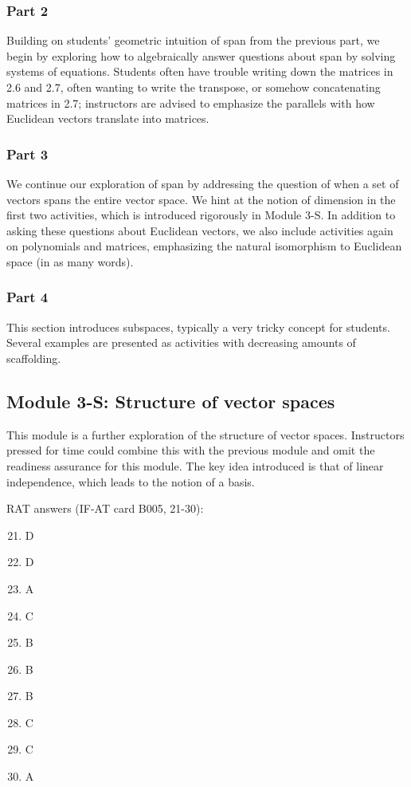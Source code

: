 \documentclass{article}
\begin{document}
\subsubsection*{Part 2}
Building on students' geometric intuition of span from the previous part, we begin by exploring how to algebraically answer questions about span by solving systems of equations.  Students often have trouble writing down the matrices in 2.6 and 2.7, often wanting to write the transpose, or somehow concatenating matrices in 2.7; instructors are advised to emphasize the parallels with how Euclidean vectors translate into matrices.

\subsubsection*{Part 3}
We continue our exploration of span by addressing the question of when a set of vectors spans the entire vector space.  We hint at the notion of dimension in the first two activities, which is introduced rigorously in Module 3-S.  In addition to asking these questions about Euclidean vectors, we also include activities again on polynomials and matrices, emphasizing the natural isomorphism to Euclidean space (in as many words).  

\subsubsection*{Part 4}
This section introduces subspaces, typically a very tricky concept for students.  Several examples are presented as activities with decreasing amounts of scaffolding.

\subsection*{Module 3-S: Structure of vector spaces}
This module is a further exploration of the structure of vector spaces.  Instructors pressed for time could combine this with the previous module and omit the readiness assurance for this module.  The key idea introduced is that of linear independence, which leads to the notion of a basis.  

RAT answers (IF-AT card B005, 21-30):
\begin{multicols}{10}
\begin{enumerate}[1)]
\setcounter{enumi}{20}
\item D
\item D
\item A
\item C
\item B
\item B
\item B
\item C
\item C
\item A
\end{enumerate}
\end{multicols}
\end{document}

